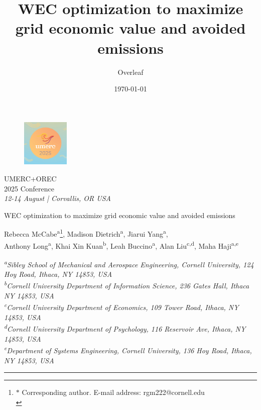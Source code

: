 \documentclass[10pt,twoside]{article}
\title{WEC optimization to maximize grid economic value and avoided emissions}
\author{Overleaf}
\date{\today}
\begin{document}
\thispagestyle{empty} 

\begin{center}
    \begin{figure}[h]
        \centering
        \includegraphics[width = 0.2\textwidth]{./logo.jpg} \\
    \end{figure}
    \vspace{-\baselineskip}
    \huge
    UMERC+OREC \\
    2025 Conference \\
    \vspace{.5\baselineskip}
    \large
    \textit{12-14 August | Corvallis, OR USA} \\
    \vspace{1\baselineskip}
       
    \Large
    WEC optimization to maximize grid economic value and avoided emissions
    \vspace{.5\baselineskip}
    
    \large
    Rebecca McCabe\textsuperscript{a}\footnote{$\ast$ Corresponding author. E-mail address:  rgm222@cornell.edu \\ },
    Madison Dietrich\textsuperscript{a},
    Jiarui Yang\textsuperscript{a}, \\
    Anthony Long\textsuperscript{a},
    Khai Xin Kuan\textsuperscript{b},
    Leah Buccino\textsuperscript{a},
    Alan Liu\textsuperscript{c,d},
    Maha Haji\textsuperscript{a,e}
    
    
    \small
    \begin{center}
        \textit{\textsuperscript{a}Sibley School of Mechanical and Aerospace Engineering, Cornell University, 124 Hoy Road, Ithaca, NY 14853, USA} \\
        \textit{\textsuperscript{b}Cornell University Department of Information Science, 236 Gates Hall, Ithaca NY 14853, USA} \\
        \textit{\textsuperscript{c}Cornell University Department of Economics, 109 Tower Road, Ithaca, NY 14853, USA} \\
        \textit{\textsuperscript{d}Cornell University Department of Psychology, 116 Reservoir Ave, Ithaca, NY 14853, USA} \\
        \textit{\textsuperscript{e}Department of Systems Engineering, Cornell University, 136 Hoy Road, Ithaca, NY 14853, USA}
    \end{center}
    \normalsize
\end{center}         
\vspace{-\baselineskip}\noindent\rule{\textwidth}{0.4pt}\vspace{-\baselineskip}
\end{document}
